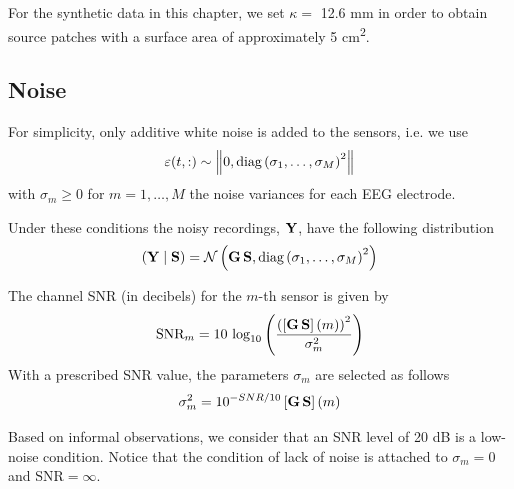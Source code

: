 
For the synthetic data in this chapter, we set $\kappa = $ 12.6 \si{mm} in order to obtain source patches with a surface area of approximately 5 \si{cm^2}.

\subsection{Noise}

For simplicity, only additive white noise is added to the sensors, i.e. we use 
\begin{equation}
    \varepsilon(t,:) \sim \left\lVert 0, \text{diag}\left(  \sigma_1, \dots, \sigma_M  \right)^2 \right\rVert
\end{equation}
with $\sigma_m \geq 0$ for $m=1, \dots, M$ the noise variances for each EEG electrode.

%
Under these conditions the noisy recordings, $\mathbf{Y}$, have the following distribution
\begin{equation}
\left( \mathbf{Y} \;\middle|\; \mathbf{S} \right) =
\mathcal{N}\left(  \mathbf{G}\, \mathbf{S}, \text{diag}\left(  \sigma_1, \dots, \sigma_M  \right)^2  \right)
\end{equation}

The channel SNR (in decibels) for the $m$-th sensor is given by
\begin{equation}
\text{SNR}_m = 
10\, \log_{10}\left(  \frac{ \left(  \left[ \mathbf{G}\, \mathbf{S} \right](m) \right)^2 }{\sigma_m^2}  \right)
\end{equation}
With a prescribed SNR value, the parameters $\sigma_m$ are selected as follows
\begin{equation}
\sigma_m^2 = 
10^{{-{SNR}/{10}} }
\left[ \mathbf{G}\, \mathbf{S} \right](m)
\end{equation}

Based on informal observations, we consider that an SNR level of 20 dB is a low-noise condition.
%
Notice that the condition of lack of noise is attached to $\sigma_m = 0$ and $\text{SNR} = \infty$.


